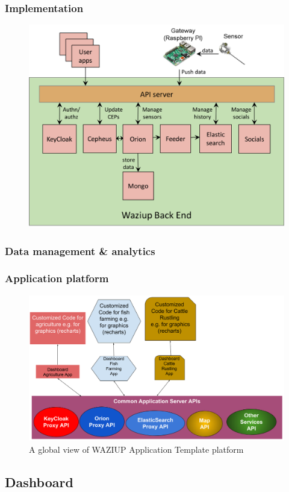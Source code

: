 \documentclass{beamer}
\begin{document}
\begin{frame}
\frametitle{Implementation}
 

  \begin{figure}
  \centering  
  \includegraphics[width=.8\linewidth]{figures/BackEnd.png}   
  \label{fig-implem}  
  \end{figure}
\end{frame}

\begin{frame}
\frametitle{Data management \& analytics}

    
\end{frame}

\begin{frame}
\frametitle{Application platform}

  \begin{figure}[H]  
  \centering  
  \includegraphics[width=.68\linewidth]{figures/AppArchitecture.png}   
  \caption{A global view of WAZIUP Application Template platform}
  \label{fig-app}
  \end{figure}
 
\end{frame}

\subsection{Dashboard}
\end{document}
